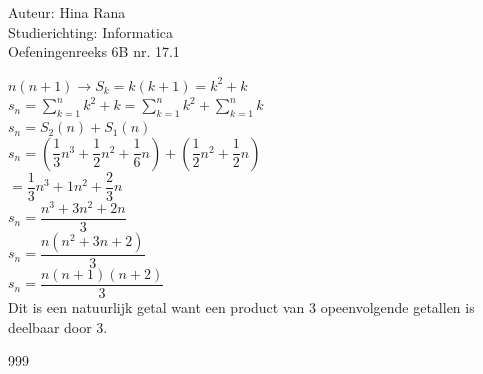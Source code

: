 \documentclass[a4paper]{article}
\begin{document}
\noindent \large Auteur: Hina Rana \\
\noindent \large Studierichting: Informatica\\
\noindent \large Oefeningenreeks 6B nr. 17.1 \\

\medskip

\normalsize

$ n(n+1) \rightarrow S_k  = k(k+1) = k^2 + k $ \\

$ s_n = \displaystyle\sum_{k=1}^{n} k^2 + k = \displaystyle\sum_{k=1}^{n} k^2 + \sum_{k=1}^{n} k $ \\

$ s_n = S_2(n) + S_1(n) $ \\

$ s_n = \left(\dfrac{1}{3} n^3 + \dfrac{1}{2} n^2 + \dfrac{1}{6} n \right) + \left(\dfrac{1}{2} n^2 + \dfrac{1}{2} n \right) $ \\

$ = \dfrac{1}{3} n^3 + 1n^2 + \dfrac{2}{3} n $ \\

$ s_n = \dfrac{n^3 + 3n^2 + 2n}{3} $ \\

$ s_n = \dfrac{n(n^2 + 3n + 2)}{3} $ \\

$ s_n = \dfrac{n(n+1)(n+2)}{3} $ \\

Dit is een natuurlijk getal want een product van 3 opeenvolgende getallen is deelbaar door 3.

\begin{thebibliography}{999}
\end{thebibliography}
\end{document}
